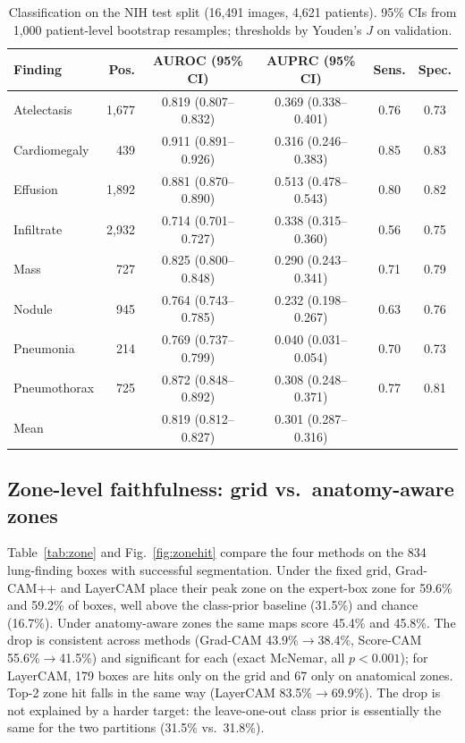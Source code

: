 \documentclass[pdflatex,sn-mathphys-num]{sn-jnl}
\begin{document}
\begin{table}[t]
\caption{Classification on the NIH test split (16,491 images, 4,621 patients). 95\% CIs from 1,000 patient-level bootstrap resamples; thresholds by Youden's $J$ on validation.}\label{tab:cls}
\centering
\begin{tabular}{lrcccc}
\toprule
Finding & Pos. & AUROC (95\% CI) & AUPRC (95\% CI) & Sens. & Spec. \\
\midrule
Atelectasis & 1,677 & 0.819 (0.807--0.832) & 0.369 (0.338--0.401) & 0.76 & 0.73 \\
Cardiomegaly & 439 & 0.911 (0.891--0.926) & 0.316 (0.246--0.383) & 0.85 & 0.83 \\
Effusion & 1,892 & 0.881 (0.870--0.890) & 0.513 (0.478--0.543) & 0.80 & 0.82 \\
Infiltrate & 2,932 & 0.714 (0.701--0.727) & 0.338 (0.315--0.360) & 0.56 & 0.75 \\
Mass & 727 & 0.825 (0.800--0.848) & 0.290 (0.243--0.341) & 0.71 & 0.79 \\
Nodule & 945 & 0.764 (0.743--0.785) & 0.232 (0.198--0.267) & 0.63 & 0.76 \\
Pneumonia & 214 & 0.769 (0.737--0.799) & 0.040 (0.031--0.054) & 0.70 & 0.73 \\
Pneumothorax & 725 & 0.872 (0.848--0.892) & 0.308 (0.248--0.371) & 0.77 & 0.81 \\
\midrule
Mean & & 0.819 (0.812--0.827) & 0.301 (0.287--0.316) & & \\
\bottomrule
\end{tabular}
\end{table}

\subsection{Zone-level faithfulness: grid vs.\ anatomy-aware zones}
Table~\ref{tab:zone} and Fig.~\ref{fig:zonehit} compare the four methods on the 834 lung-finding boxes with successful segmentation. Under the fixed grid, Grad-CAM++ and LayerCAM place their peak zone on the expert-box zone for 59.6\% and 59.2\% of boxes, well above the class-prior baseline (31.5\%) and chance (16.7\%). Under anatomy-aware zones the same maps score 45.4\% and 45.8\%. The drop is consistent across methods (Grad-CAM 43.9\%$\to$38.4\%, Score-CAM 55.6\%$\to$41.5\%) and significant for each (exact McNemar, all $p<0.001$); for LayerCAM, 179 boxes are hits only on the grid and 67 only on anatomical zones. Top-2 zone hit falls in the same way (LayerCAM 83.5\%$\to$69.9\%). The drop is not explained by a harder target: the leave-one-out class prior is essentially the same for the two partitions (31.5\% vs.\ 31.8\%).
\end{document}
